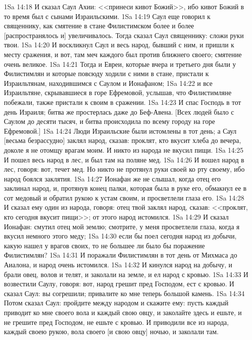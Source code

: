 \vs 1Sa 14:18 И сказал Саул Ахии: <<принеси кивот Божий>>, ибо кивот Божий в то время был с сынами Израильскими.
\vs 1Sa 14:19 Саул еще говорил к священнику, как смятение в стане Филистимском более и более [распространялось и] увеличивалось. Тогда сказал Саул священнику: сложи руки твои.
\vs 1Sa 14:20 И воскликнул Саул и весь народ, бывший с ним, и пришли к месту сражения, и вот, там меч каждого  был против ближнего своего; смятение  очень великое.
\vs 1Sa 14:21 Тогда и Евреи, которые вчера и третьего дня были у Филистимлян и которые повсюду ходили с ними в стане, пристали к Израильтянам, находившимся с Саулом и Ионафаном;
\vs 1Sa 14:22 и все Израильтяне, скрывавшиеся в горе Ефремовой, услышав, что Филистимляне побежали, также пристали к своим в сражении.
\vs 1Sa 14:23 И спас Господь в тот день Израиля; битва же простерлась даже до Беф-Авена. [Всех людей было с Саулом до десяти тысяч, и битва происходила по всему городу на горе Ефремовой.]
\rsbpar\vs 1Sa 14:24 Люди Израильские были истомлены в тот день; а Саул [весьма безрассудно] заклял народ, сказав: проклят, кто вкусит хлеба до вечера, доколе я не отомщу врагам моим. И никто из народа не вкусил пищи.
\vs 1Sa 14:25 И пошел весь народ в лес, и был там на поляне мед.
\vs 1Sa 14:26 И вошел народ в лес, говоря: вот, течет мед. Но никто не протянул руки своей ко рту своему, ибо народ боялся заклятия.
\vs 1Sa 14:27 Ионафан же не слышал, когда отец его заклинал народ, и, протянув конец палки, которая была в руке его, обмакнул ее в сот медовый и обратил рукою к устам своим, и просветлели глаза его.
\vs 1Sa 14:28 И сказал ему один из народа, говоря: отец твой заклял народ, сказав: <<проклят, кто сегодня вкусит пищи>>; от этого народ истомился.
\vs 1Sa 14:29 И сказал Ионафан: смутил отец мой землю; смотрите, у меня просветлели глаза, когда я вкусил немного этого меду;
\vs 1Sa 14:30 если бы поел сегодня народ из добычи, какую нашел у врагов своих, то не большее ли было бы поражение Филистимлян?
\vs 1Sa 14:31 И поражали Филистимлян в тот день от Михмаса до Аиалона, и народ очень истомился.
\vs 1Sa 14:32 И кинулся народ на добычу, и брали овец, волов и телят, и заколали на земле, и ел народ с кровью.
\vs 1Sa 14:33 И возвестили Саулу, говоря: вот, народ грешит пред Господом, ест с кровью. И сказал Саул: вы согрешили; привалите ко мне теперь большой камень.
\vs 1Sa 14:34 Потом сказал Саул: пройдите между народом и скажите ему: пусть каждый приводит ко мне своего вола и каждый свою овцу, и заколайте здесь и ешьте, и не грешите пред Господом, не ешьте с кровью. И приводили все из народа, каждый своею рукою, вола своего [и свою овцу] ночью, и заколали там.
